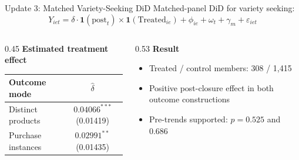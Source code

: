 \documentclass[aspectratio=169]{beamer}  %
\begin{document}
\begin{frame}{Update 3: Matched Variety-Seeking DiD}
Matched-panel DiD for variety seeking:
\begingroup
\small
\[
Y_{iet} =
\delta \cdot \mathbf{1}(\text{post}_{t}) \times \mathbf{1}(\text{Treated}_{ie})
+ \phi_{ie} + \omega_t + \gamma_m + \varepsilon_{iet}
\]
\endgroup

\begin{columns}[T]
\begin{column}{0.45\linewidth}
\textbf{Estimated treatment effect}
\begin{table}[h]
\centering
\scriptsize
\begin{tabular}{lc}
\toprule
Outcome mode & $\hat{\delta}$ \\
\midrule
Distinct products & $0.04066^{***}$ (0.01419) \\
Purchase instances & $0.02991^{**}$ (0.01435) \\
\bottomrule
\end{tabular}
\end{table}
\end{column}
\begin{column}{0.53\linewidth}
\textbf{Result}
\begin{itemize}
    \item Treated / control members: 308 / 1,415
    \item Positive post-closure effect in both outcome constructions
    \item Pre-trends supported: $p=0.525$ and $0.686$
\end{itemize}
\end{column}
\end{columns}
\end{frame}
\end{document}

